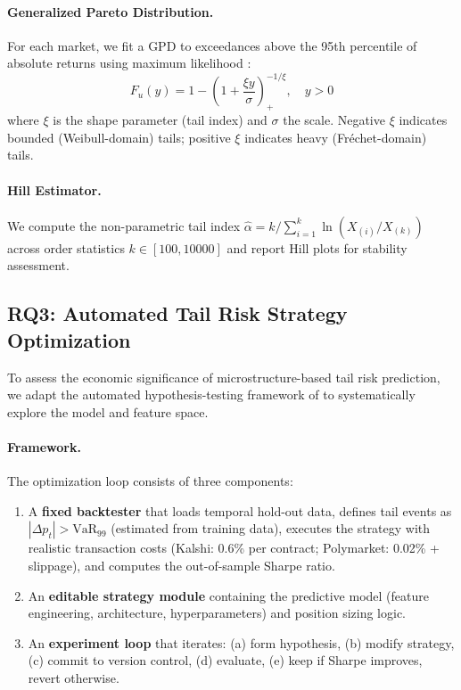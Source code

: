 \documentclass[11pt]{article}
\begin{document}
\paragraph{Generalized Pareto Distribution.}
For each market, we fit a GPD to exceedances above the 95th percentile of absolute returns using maximum likelihood \citep{coles2001introduction,mcneil2000estimation}:
\begin{equation}
    F_u(y) = 1 - \left(1 + \frac{\xi y}{\sigma}\right)^{-1/\xi}_+, \quad y > 0
\end{equation}
where $\xi$ is the shape parameter (tail index) and $\sigma$ the scale. Negative $\xi$ indicates bounded (Weibull-domain) tails; positive $\xi$ indicates heavy (Fr\'{e}chet-domain) tails.

\paragraph{Hill Estimator.}
We compute the non-parametric tail index $\hat{\alpha} = k / \sum_{i=1}^{k} \ln(X_{(i)}/X_{(k)})$ across order statistics $k \in [100, 10000]$ and report Hill plots for stability assessment.

\subsection{RQ3: Automated Tail Risk Strategy Optimization}
\label{sec:method_autoresearch}

To assess the economic significance of microstructure-based tail risk prediction, we adapt the automated hypothesis-testing framework of \citet{karpathy2025autoresearch} to systematically explore the model and feature space.

\paragraph{Framework.}
The optimization loop consists of three components:
\begin{enumerate}
    \item A \textbf{fixed backtester} that loads temporal hold-out data, defines tail events as $|\Delta p_t| > \text{VaR}_{99}$ (estimated from training data), executes the strategy with realistic transaction costs (Kalshi: 0.6\% per contract; Polymarket: 0.02\% + slippage), and computes the out-of-sample Sharpe ratio.
    \item An \textbf{editable strategy module} containing the predictive model (feature engineering, architecture, hyperparameters) and position sizing logic.
    \item An \textbf{experiment loop} that iterates: (a) form hypothesis, (b) modify strategy, (c) commit to version control, (d) evaluate, (e) keep if Sharpe improves, revert otherwise.
\end{enumerate}
\end{document}
